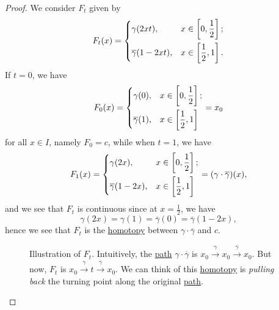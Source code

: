 \begin{proof}
	\par We consider \(F_t\) given by
	\[
		F_{t}(x) = \begin{dcases}
			\gamma(2xt),              & x\in\left[0, \frac{1}{2}\right]; \\
			\overline{\gamma}(1-2xt), & x\in\left[\frac{1}{2}, 1\right].
		\end{dcases}
	\]
	If \(t = 0\), we have
	\[
		F_{0}(x) = \begin{dcases}
			\gamma(0),            & x\in\left[0, \frac{1}{2}\right]; \\
			\overline{\gamma}(1), & x\in\left[\frac{1}{2}, 1\right]
		\end{dcases} = x_0
	\]
	for all \(x\in I\), namely \(F_0 = c\), while when \(t = 1\), we have
	\[
		F_{1}(x) = \begin{dcases}
			\gamma(2x),              & x\in\left[0, \frac{1}{2}\right]; \\
			\overline{\gamma}(1-2x), & x\in\left[\frac{1}{2}, 1\right]
		\end{dcases} = (\gamma\cdot \overline{\gamma})(x),
	\]
	and we see that \(F_t\) is continuous since at \(x = \frac{1}{2}\), we have
	\[
		\gamma(2x) = \gamma(1) = \overline{\gamma} (0) = \overline{\gamma} (1 - 2x),
	\]
	hence we see that \(F_{t}\) is the \hyperref[def:homotopy]{homotopy} between \(\gamma\cdot \overline{\gamma} \) and \(c\).
	\begin{figure}[H]
		\centering
		\caption{Illustration of \(F_t\). Intuitively, the \hyperref[def:path]{path} \(\gamma\cdot \overline{\gamma}\) is \(x_0 \overset{\gamma}{\to} x_0 \overset{\overline{\gamma} }{\to} x_0\).
			But now, \(F_t\) is \(x_0 \overset{\gamma}{\to} t \overset{\overline{\gamma} }{\to} x_0\). We can think of this \hyperref[def:homotopy]{homotopy} is \emph{pulling back}
			the turning point along the original \hyperref[def:path]{path}.}
		\label{fig:def:fundamental-group}
	\end{figure}
\end{proof}

